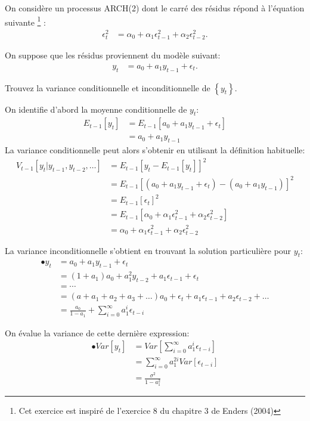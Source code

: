 \begin{exercice}
  On considère un processus ARCH(2) dont le carré des résidus répond à l'équation suivante \footnote{Cet exercice est inspiré de l'exercice 8 du chapitre 3 de Enders (2004)} :
\begin{align*}
\epsilon_t^2 &= \alpha_0 + \alpha_1\epsilon_{t-1}^2 + \alpha_2\epsilon_{t-2}^2.
\end{align*}

On suppose que les résidus proviennent du modèle suivant:
\begin{align*}
y_t &= a_0 + a_1 y_{t-1} + \epsilon_t.
\end{align*}

Trouvez la variance conditionnelle et inconditionnelle de $\left\{ y_t \right\}$.
\begin{sol}
  On identifie d'abord la moyenne conditionnelle de $y_t$:
\begin{align}
E_{t-1}[y_t] &= E_{t-1}[a_0 + a_1 y_{t-1} + \epsilon_t] \\
&= a_0 + a_1 y_{t-1}
\end{align}
La variance conditionnelle peut alors s'obtenir en utilisant la définition habituelle:
\begin{align*}
V_{t-1}[y_t | y_{t-1}, y_{t-2}, \ldots] &= E_{t-1}[y_t - E_{t-1}[y_t]]^{2} \\
&= E_{t-1}[(a_0 + a_1 y_{t-1} + \epsilon_t)-(a_0 + a_1 y_{t-1})]^{2} \\
&= E_{t-1}[\epsilon_t]^{2} \\
&= E_{t-1}[\alpha_0 + \alpha_1\epsilon_{t-1}^2 + \alpha_2\epsilon_{t-2}^2] \\
&= \alpha_0 + \alpha_1\epsilon_{t-1}^2 + \alpha_2\epsilon_{t-2}^2
\end{align*}

La variance inconditionnelle s'obtient en trouvant la solution particulière pour $y_t$:
\begin{align*}
•y_t &= a_0 + a_1 y_{t-1} + \epsilon_t \\
&= (1+a_1)a_0 + a_1^2 y_{t-2} + a_1 \epsilon_{t-1} + \epsilon_t \\
&= \cdots \\
&= (a+a_1+a_2+a_3+\ldots)a_0 + \epsilon_t + a_1\epsilon_{t-1} + a_2\epsilon_{t-2} + \ldots \\
&= \frac{a_0}{1-a_1} + \sum_{i=0}^{\infty} a_1^{i}\epsilon_{t-i}
\end{align*}

On évalue la variance de cette dernière expression:
\begin{align*}
•Var[y_t] &= Var[\sum_{i=0}^{\infty} a_1^{i}\epsilon_{t-i}] \\
&= \sum_{i=0}^{\infty} a_1^{2i} Var[\epsilon_{t-i}] \\
&= \frac{\sigma^2}{1-a_1^2}
\end{align*}


\end{sol}
\end{exercice}
